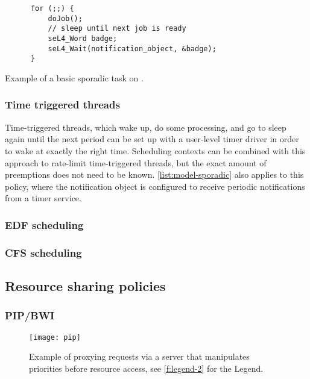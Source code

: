 \begin{listing}
  \begin{verbatim}
      for (;;) {
          doJob();
          // sleep until next job is ready
          seL4_Word badge;
          seL4_Wait(notification_object, &badge);
      }
  \end{verbatim}
  \caption{Example of a basic sporadic task on \selfour.}
  \label{list:model-sporadic}
\end{listing}

\subsubsection{Time triggered threads}

Time-triggered threads, which wake up, do some processing, and go to sleep again until the next
period can be set up with a user-level timer driver in order to wake at exactly the right time.
Scheduling contexts can be combined with this approach to rate-limit time-triggered threads, but 
the exact amount of preemptions does not need to be known.
\cref{list:model-sporadic} also applies to this policy, where the notification object is configured to
receive periodic notifications from a timer service.

\subsubsection{EDF scheduling}


\subsubsection{CFS scheduling}


\subsection{Resource sharing policies}

\subsubsection{\gls{PIP}/\gls{BWI}}
\label{sec:model-pip-bwi}

\begin{figure}
    \centering
    \texttt{[image: pip]}
    \caption[Example of proxying requests via a server.]{Example of proxying requests via a server that manipulates priorities before resource
    access, see \cref{f:legend-2} for the Legend.}
    \label{f:model-pip}
\end{figure}
 
